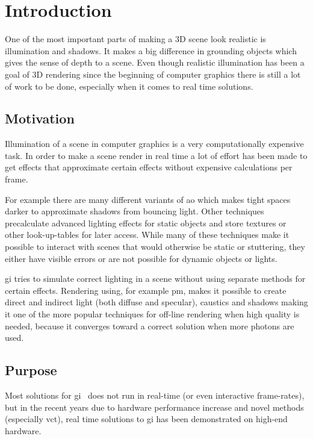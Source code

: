 \chapter{Introduction}\label{cha:intro}

One of the most important parts of making a 3D scene look realistic is illumination and shadows. 
It makes a big difference in grounding objects which gives the sense of depth to a scene. 
Even though realistic illumination has been a goal of 3D rendering since the beginning of computer graphics there is still a lot of work to be done, especially when it comes to real time solutions.

\section{Motivation}

Illumination of a scene in computer graphics is a very computationally expensive task. 
In order to make a scene render in real time a lot of effort has been made to get effects that approximate certain effects without expensive calculations per frame.

For example there are many different variants of \gls{ao} which makes tight spaces darker to approximate shadows from bouncing light. 
Other techniques precalculate advanced lighting effects for static objects and store textures or other look-up-tables for later access. 
While many of these techniques make it possible to interact with scenes that would otherwise be static or stuttering, they either have visible errors or are not possible for dynamic objects or lights.

\gls{gi} tries to simulate correct lighting in a scene without using separate methods for certain effects. 
Rendering using, for example \gls{pm}, makes it possible to create direct and indirect light (both diffuse and specular), caustics and shadows making it one of the more popular techniques for off-line rendering when high quality is needed, because it converges toward a correct solution when more photons are used.

\section{Purpose}

Most solutions for \gls{gi}~\cite{sotagi} does not run in real-time (or even interactive frame-rates), but in the recent years due to hardware performance increase and novel methods (especially \gls{vct}), real time solutions to \gls{gi} has been demonstrated on high-end hardware. 

